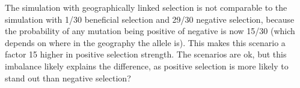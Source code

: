 \begin{point}{}
The simulation with geographically linked selection is not comparable to the simulation with 1/30 beneficial selection and 29/30 negative selection, because the probability of any mutation being positive of negative is now 15/30 (which depends on where in the geography the allele is). This makes this scenario a factor 15 higher in positive selection strength. The scenarios are ok, but this imbalance likely explains the difference, as positive selection is more likely to stand out than negative selection? 
\end{point}

